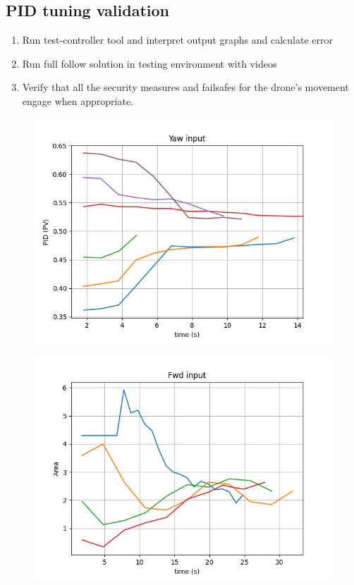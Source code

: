\subsection{PID tuning validation}

\begin{enumerate}
    \item Run test-controller tool and interpret output graphs and calculate error 
    \item Run full follow solution in testing environment with videos
    \item Verify that all the security measures and failsafes for the drone's movement engage when appropriate.
\end{enumerate}

\begin{figure}
  \centering
  \includegraphics[width=.8\textwidth, keepaspectratio]{img/4.1-tune/yaw_validate_1.png}
  \caption{}\label{}
\end{figure}

\begin{figure}
  \centering
  \includegraphics[width=.8\textwidth, keepaspectratio]{img/4.1-tune/fwd_validate_1.png}
  \caption{}\label{}
\end{figure}


\clearpage




\cleardoublepage